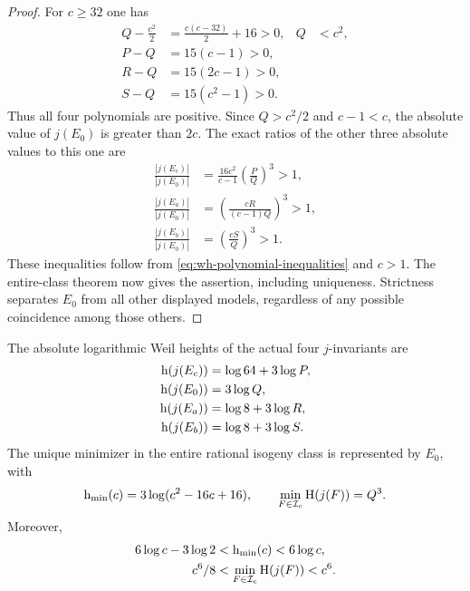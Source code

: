 \begin{proof}
For $c\ge32$ one has
\begin{equation}\label{eq:wh-polynomial-inequalities}
 \begin{aligned}
 Q-\frac{c^2}{2}&=\frac{c(c-32)}2+16>0,& Q&<c^2,\\
 P-Q&=15(c-1)>0,\\
 R-Q&=15(2c-1)>0,\\
 S-Q&=15(c^2-1)>0.
 \end{aligned}
\end{equation}
Thus all four polynomials are positive.
Since $Q>c^2/2$ and $c-1<c$, the absolute value of $j(E_0)$
is greater than $2c$. The exact ratios of the other three
absolute values to this one are
\begin{equation}\label{eq:wh-three-ratios}
 \begin{aligned}
 \frac{|j(E_c)|}{|j(E_0)|}
   &=\frac{16c^2}{c-1}\left(\frac P Q\right)^3>1,\\
 \frac{|j(E_a)|}{|j(E_0)|}
   &=\left(\frac{cR}{(c-1)Q}\right)^3>1,\\
 \frac{|j(E_b)|}{|j(E_0)|}
   &=\left(\frac{cS}{Q}\right)^3>1.
 \end{aligned}
\end{equation}
These inequalities follow from
\eqref{eq:wh-polynomial-inequalities} and $c>1$.
The entire-class theorem now gives the assertion, including
uniqueness. Strictness separates $E_0$ from all other displayed
models, regardless of any possible coincidence among those others.
\end{proof}

\begin{theorem}\label{thm:wh-exact-minimum}
The absolute logarithmic Weil heights of the actual four
$j$-invariants are
\begin{equation}\label{eq:wh-height-table}
 \begin{aligned}
 \mathrm h(j(E_c))&=\log64+3\log P,\\
 \mathrm h(j(E_0))&=3\log Q,\\
 \mathrm h(j(E_a))&=\log8+3\log R,\\
 \mathrm h(j(E_b))&=\log8+3\log S.
 \end{aligned}
\end{equation}
The unique minimizer in the entire rational isogeny class is
represented by $E_0$, with
\begin{equation}\label{eq:wh-exact-minimum}
 \mathrm h_{\min}(c)=3\log(c^2-16c+16),\qquad
 \min_{F\in\mathcal I_c}\mathrm H(j(F))=Q^3.
\end{equation}
Moreover,
\begin{equation}\label{eq:wh-height-bounds}
 \begin{aligned}
 6\log c-3\log2&<\mathrm h_{\min}(c)<6\log c,\\
 c^6/8&<\min_{F\in\mathcal I_c}\mathrm H(j(F))<c^6.
 \end{aligned}
\end{equation}
\end{theorem}

